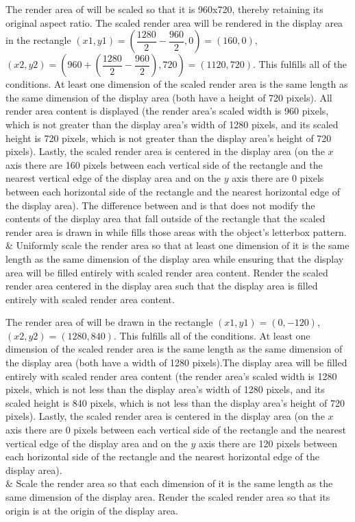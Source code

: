 \begin{libreqtab2}
 \enterexample
 The render area of  will be scaled so that it is 960x720, thereby retaining its original aspect ratio. The scaled render area will be rendered in the display area in the rectangle $(x1,y1) = (\dfrac{1280}{2} - \dfrac{960}{2},0) = (160,0)$, $(x2,y2) = (960 + (\dfrac{1280}{2} - \dfrac{960}{2}),720) = (1120,720)$. This fulfills all of the conditions. At least one dimension of the scaled render area is the same length as the same dimension of the display area (both have a height of 720 pixels). All render area content is displayed (the render area's scaled width is 960 pixels, which is not greater than the display area's width of 1280 pixels, and its scaled height is 720 pixels, which is not greater than the display area's height of 720 pixels). Lastly, the scaled render area is centered in the display area (on the $x$ axis there are 160 pixels between each vertical side of the rectangle and the nearest vertical edge of the display area and on the $y$ axis there are 0 pixels between each horizontal side of the rectangle and the nearest horizontal edge of the display area).
 \exitexample
 \enternote
 The difference between  and  is that  does not modify the contents of the display area that fall outside of the rectangle that the scaled render area is drawn in while  fills those areas with the  object's letterbox pattern.
 \exitnote
 \\
 & Uniformly scale the render area so that at least one dimension of it is the same length as the same dimension of the display area while ensuring that the display area will be filled entirely with scaled render area content. Render the scaled render area centered in the display area such that the display area is filled entirely with scaled render area content.
 
 \enterexample
 The render area of  will be drawn in the rectangle $(x1,y1) = (0,-120)$, $(x2,y2) = (1280,840)$. This fulfills all of the conditions. At least one dimension of the scaled render area is the same length as the same dimension of the display area (both have a width of 1280 pixels).The display area will be filled entirely with scaled render area content (the render area's scaled width is 1280 pixels, which is not less than the display area's width of 1280 pixels, and its scaled height is 840 pixels, which is not less than the display area's height of 720 pixels). Lastly, the scaled render area is centered in the display area (on the $x$ axis there are 0 pixels between each vertical side of the rectangle and the nearest vertical edge of the display area and on the $y$ axis there are 120 pixels between each horizontal side of the rectangle and the nearest horizontal edge of the display area).
 \exitexample 
 \\
 & Scale the render area so that each dimension of it is the same length as the same dimension of the display area. Render the scaled render area so that its origin is at the origin of the display area.
 

\end{libreqtab2}
